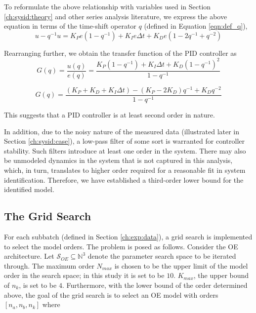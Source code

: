 To reformulate the above relationship with variables used in Section \ref{ch:sysid:theory} and other series analysis literature, we express the above equation in terms of the time-shift operator $q$ (defined in Equation \ref{eqn:def_q}), 
\begin{equation}
    u-q^{-1}u = K_P e (1-q^{-1}) + K_I e \Delta t + K_D e (1-2q^{-1}+q^{-2})
\end{equation}

Rearranging further, we obtain the transfer function of the PID controller as
\begin{equation}
    G(q) = \frac{u(q)}{e(q)} = \frac{K_P (1-q^{-1}) + K_I \Delta t + K_D (1-q^{-1})^2}{1-q^{-1}}
\end{equation}

\begin{equation}
    G(q) = \frac{(K_P + K_D + K_I\Delta t) - (K_P-2K_D) q^{-1} + K_D q^{-2}}{1-q^{-1}}
\end{equation}

This suggests that a PID controller is at least second order in nature. 

In addition, due to the noisy nature of the measured data (illustrated later in Section \ref{ch:sysid:case}), a low-pass filter of some sort is warranted for controller stability. Such filters introduce at least one order in the system. There may also be unmodeled dynamics in the system that is not captured in this analysis, which, in turn, translates to higher order required for a reasonable fit in system identification. Therefore, we have established a third-order lower bound for the identified model. 

\subsection{The Grid Search} \label{ch:sysid:proc:grid}

For each subbatch (defined in Section \ref{ch:exp:data}), a grid search is implemented to select the model orders. The problem is posed as follows. Consider the OE architecture. Let $\mathcal{S}_{OE} \subseteq \mathbb{N}^3$ denote the parameter search space to be iterated through. The maximum order $N_{max}$ is chosen to be the upper limit of the model order in the search space; in this study it is set to be $10$. $K_{max}$, the upper bound of $n_k$, is set to be $4$. Furthermore, with the lower bound of the order determined above, the goal of the grid search is to select an OE model with orders $[n_a, n_b, n_k]$ where

